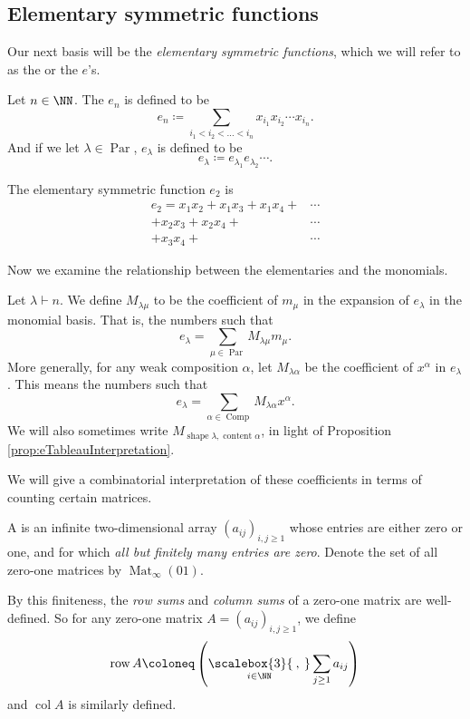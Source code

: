 \documentclass{article}
\newcommand{\bigcomma}{\ensuremath{\mathop{\scalebox{3}{\:,\:}}\limits}}
\DeclareMathOperator{\row}{row}
\DeclareMathOperator{\col}{col}
\DeclareMathOperator{\shape}{shape}
\DeclareMathOperator{\content}{content}
\DeclareMathOperator{\Par}{Par}
\DeclareMathOperator{\Com}{Comp}
\DeclareMathOperator{\Mat}{Mat}
\begin{document}
\subsection{Elementary symmetric functions}

Our next basis will be the \textit{elementary symmetric functions}, which we will refer to as the  or the $e$'s.

\begin{definition}
    Let $n\in\NN$. 
    The  $e_n$ is defined to be
    \[
        e_n 
        \coloneq 
        \sum_{i_1<i_2<\ldots<i_n} x_{i_1}x_{i_2}\cdots x_{i_n}.
    \]
    And if we let $\lambda \in \Par$, $e_\lambda$ is defined to be
    \[
        e_\lambda 
        \coloneq 
        e_{\lambda_1}e_{\lambda_2}\cdots.
    \]
\end{definition}

\begin{example}
    The elementary symmetric function $e_2$ is
    \begin{align*}
        e_2 = x_1x_2 + x_1x_3 + x_1x_4 + &\cdots \\
        + x_2x_3 + x_2x_4 + &\cdots \\
        + x_3x_4 + &\cdots
    \end{align*}
\end{example}

Now we examine the relationship between the elementaries and the monomials.

\begin{definition}
    Let $\lambda \vdash n$. We define $M_{\lambda\mu}$ to be the coefficient of $m_\mu$ in the expansion of $e_\lambda$ in the monomial basis. That is, the numbers such that
    \[
        e_\lambda = \sum_{\mu \in \Par} M_{\lambda\mu} m_\mu.
    \]
    More generally, for any weak composition $\alpha$, let $M_{\lambda\alpha}$ be the coefficient of $x^\alpha$ in $e_\lambda$.
    This means the numbers such that
    \[
        e_\lambda = \sum_{\alpha \in \Com} M_{\lambda\alpha} x^\alpha.
    \]
    We will also sometimes write $M_{\shape \lambda, \content \alpha}$, in light of Proposition \ref{prop:eTableauInterpretation}.
\end{definition}

We will give a combinatorial interpretation of these coefficients in terms of counting certain matrices.

\begin{definition}
    A  is an infinite two-dimensional array $(a_{ij})_{i,j \geq 1}$ whose entries are either zero or one, and for which \textit{all but finitely many entries are zero}.
    Denote the set of all zero-one matrices by $\Mat_\infty(01)$.

    By this finiteness, the \textit{row sums} and \textit{column sums} of a zero-one matrix are well-defined.
    So for any zero-one matrix $A = (a_{ij})_{i,j \geq 1}$, we define
    \[
        \row A \coloneq \left(\bigcomma_{i \in \NN} \sum_{j \geq 1} a_{ij}\right)
    \]
    and $\col A$ is similarly defined.
\end{definition}
\end{document}
